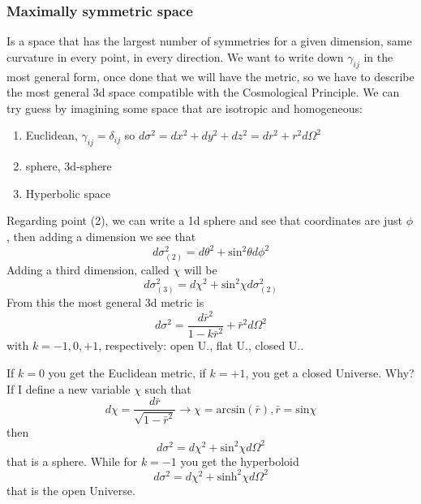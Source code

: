 \subsubsection{Maximally symmetric space}
Is a space that has the largest number of symmetries for a given dimension, same curvature in every point, in every direction.
We want to write down $\gamma _{ij}$ in the most general form, once done that we will have the metric, so we have to describe the most general 3d space compatible with the Cosmological Principle. We can try guess by imagining some space that are isotropic and homogeneous:
\begin{enumerate}
\item Euclidean, $\gamma _{ij} = \delta _{ij}$ so $d\sigma ^{2 }= dx^{2}+dy^{2}+dz^{2} = dr^{2}+r^{2}d\Omega ^{2}$
\item sphere, 3d-sphere
\item Hyperbolic space
\end{enumerate}
Regarding point (2), we can write a 1d sphere and see that coordinates are just $\phi $, then adding a dimension we see that 
\[
d\sigma ^{2}_{\left( 2 \right)} = d\theta ^{2} +\text{sin}^{2}\theta d\phi^{2}	
\]
Adding a third dimension, called $\chi $ will be
\[
d\sigma ^{2}_{\left( 3 \right)} = d\chi ^{2} + \text{sin}^{2}\chi d\sigma ^{2}_{\left( 2 \right)}
\]
From this the most general 3d metric is 
\[
	d\sigma^{2} = \frac{d \bar{r}^{2}}{1- k \bar{r}^{2}} + \bar{r}^{2}d\Omega ^{2}		
\]
with $k = {-1,0,+1}$, respectively: open U., flat U., closed U..\par
If $k=0$ you get the Euclidean metric, if $k=+1$, you get a closed Universe. Why? If I define a new variable $\chi $ such that
\[
	d\chi = \frac{d\bar{r}}{\sqrt{1-\bar{r}^{2}}} \to \chi = \text{arcsin}\left( \bar{r} \right) , \bar{r} = \text{sin} \chi 
\]
then 
\[
d\sigma ^{2} = d\chi ^{2} + \text{sin}^{2}\chi d\Omega ^{2}
\]
that is a sphere. While for $k = -1$ you get the hyperboloid
\[
d\sigma ^{2 } = d\chi ^{2}+ \text{sinh}^{2}\chi d\Omega ^{2}
\]
that is the open Universe.

